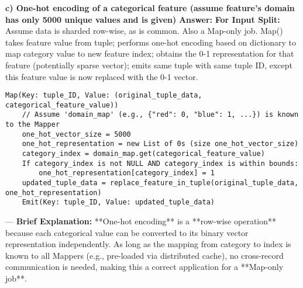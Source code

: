 \documentclass{article}
\begin{document}
\begin{enumerate}[label=\textbf{Question \arabic*.}]
  \textbf{c) One-hot encoding of a categorical feature (assume feature's domain has only 5000 unique values and is given)}
    \textbf{Answer:}
    \textbf{For Input Split:} Assume data is sharded row-wise, as is common.
    Also a Map-only job. Map() takes feature value from tuple; performs one-hot encoding based on dictionary to map category value to new feature index; obtains the 0-1 representation for that feature (potentially sparse vector); emits same tuple with same tuple ID, except this feature value is now replaced with the 0-1 vector.
    \begin{lstlisting}
Map(Key: tuple_ID, Value: (original_tuple_data, categorical_feature_value))
    // Assume 'domain_map' (e.g., {"red": 0, "blue": 1, ...}) is known to the Mapper
    one_hot_vector_size = 5000
    one_hot_representation = new List of 0s (size one_hot_vector_size)
    category_index = domain_map.get(categorical_feature_value)
    If category_index is not NULL AND category_index is within bounds:
        one_hot_representation[category_index] = 1
    updated_tuple_data = replace_feature_in_tuple(original_tuple_data, one_hot_representation)
    Emit(Key: tuple_ID, Value: updated_tuple_data)
    \end{lstlisting}
    ---
    \textbf{Brief Explanation:} **One-hot encoding** is a **row-wise operation** because each categorical value can be converted to its binary vector representation independently. As long as the mapping from category to index is known to all Mappers (e.g., pre-loaded via distributed cache), no cross-record communication is needed, making this a correct application for a **Map-only job**.


\end{enumerate}
\end{document}
